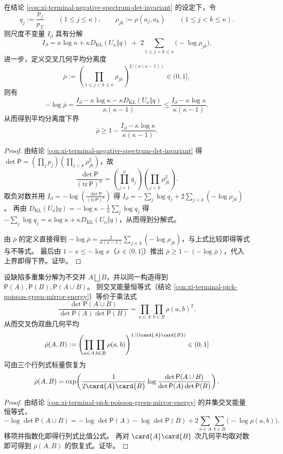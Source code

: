 \begin{auditthm}\label{thm:xi-schur-ledger-ipartial-weight-geometry-split}
在结论 \ref{con:xi-terminal-negative-spectrum-det-invariant} 的设定下，令
\[
q_j:=\frac{p_j}{p_\Sigma}\qquad(1\le j\le\kappa),
\qquad
\rho_{jk}:=\rho(a_j,a_k)\qquad(1\le j<k\le\kappa).
\]
则尺度不变量 \(I_\partial\) 具有分解
\[
I_\partial
=\kappa\log\kappa+\kappa D_{\mathrm{KL}}(U_\kappa\Vert q)
\;+\;
2\sum_{1\le j<k\le\kappa}\bigl(-\log\rho_{jk}\bigr).
\]
进一步，定义交叉几何平均分离度
\[
\bar\rho:=\left(\prod_{1\le j<k\le\kappa}\rho_{jk}\right)^{2/(\kappa(\kappa-1))}\in(0,1],
\]
则有
\[
-\log\bar\rho
=\frac{I_\partial-\kappa\log\kappa-\kappa D_{\mathrm{KL}}(U_\kappa\Vert q)}{\kappa(\kappa-1)}
\le
\frac{I_\partial-\kappa\log\kappa}{\kappa(\kappa-1)}.
\]
从而得到平均分离度下界
\[
\bar\rho\ge 1-\frac{I_\partial-\kappa\log\kappa}{\kappa(\kappa-1)}.
\]
\end{auditthm}
\begin{proof}
由结论 \ref{con:xi-terminal-negative-spectrum-det-invariant} 得
\(
\det\mathsf P=(\prod_j p_j)(\prod_{j<k}\rho_{jk}^2)
\)，故
\[
\frac{\det\mathsf P}{(\mathrm{tr}\,\mathsf P)^\kappa}
=\left(\prod_{j=1}^{\kappa}q_j\right)\left(\prod_{j<k}\rho_{jk}^2\right).
\]
取负对数并用 \(I_\partial=-\log\!\left(\frac{\det\mathsf P}{(\mathrm{tr}\,\mathsf P)^\kappa}\right)\) 得
\(
I_\partial=-\sum_j\log q_j+2\sum_{j<k}(-\log\rho_{jk})
\)。
再由
\(
D_{\mathrm{KL}}(U_\kappa\Vert q)=-\log\kappa-\frac1\kappa\sum_j\log q_j
\)
得 \(-\sum_j\log q_j=\kappa\log\kappa+\kappa D_{\mathrm{KL}}(U_\kappa\Vert q)\)，从而得到分解式。
\par
由 \(\bar\rho\) 的定义直接得到
\(
-\log\bar\rho=\frac{2}{\kappa(\kappa-1)}\sum_{j<k}(-\log\rho_{jk})
\)，与上式比较即得等式与不等式。
最后由 \(1-x\le -\log x\)（\(x\in(0,1]\)）推出 \(\bar\rho\ge 1-(-\log\bar\rho)\)，代入上界即得下界。证毕。
\end{proof}

\begin{auditprop}[并集交叉能量的行列式比值外部化]\label{prop:xi-schur-ledger-union-det-ratio-geometric-mean}
设缺陷多重集分解为不交并 \(A\bigsqcup B\)，并以同一构造得到 \(\mathsf P(A),\mathsf P(B),\mathsf P(A\cup B)\)。
则交叉能量恒等式（结论 \ref{con:xi-terminal-pick-poisson-green-mirror-energy}）等价于乘法式
\[
\frac{\det\mathsf P(A\cup B)}{\det\mathsf P(A)\det\mathsf P(B)}
=\prod_{a\in A}\prod_{b\in B}\rho(a,b)^2.
\]
从而交叉伪双曲几何平均
\[
\bar\rho(A,B)
:=\left(\prod_{a\in A}\prod_{b\in B}\rho(a,b)\right)^{1/(\card{A}\card{B})}\in(0,1]
\]
可由三个行列式标量恢复为
\[
\bar\rho(A,B)
=\exp\!\left(
\frac{1}{2\card{A}\card{B}}
\log\frac{\det\mathsf P(A\cup B)}{\det\mathsf P(A)\det\mathsf P(B)}
\right).
\]
\end{auditprop}
\begin{proof}
由结论 \ref{con:xi-terminal-pick-poisson-green-mirror-energy} 的并集交叉能量恒等式，
\[
-\log\det\mathsf P(A\cup B)
=-\log\det\mathsf P(A)-\log\det\mathsf P(B)
+2\sum_{a\in A}\sum_{b\in B}\bigl(-\log\rho(a,b)\bigr).
\]
移项并指数化即得行列式比值公式。
再对 \(\card{A}\card{B}\) 次几何平均取对数即可得到 \(\bar\rho(A,B)\) 的恢复式。证毕。
\end{proof}

\endinput
